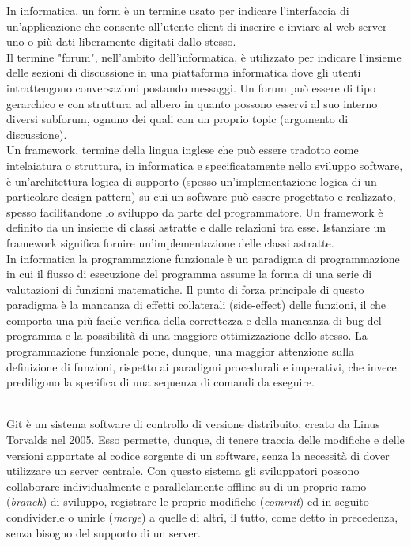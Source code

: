 \documentclass{scalatekids-article}
\begin{document}
 In informatica, un form è un termine usato per indicare l'interfaccia di un'applicazione che consente all'utente client di inserire e inviare al web server uno o più dati liberamente digitati dallo stesso.
\\

 Il termine "forum", nell'ambito dell'informatica, è utilizzato per indicare l'insieme delle sezioni di discussione in una piattaforma informatica dove gli utenti intrattengono conversazioni postando messaggi.
Un forum può essere di tipo gerarchico e con struttura ad albero in quanto possono esservi al suo interno diversi subforum, ognuno dei quali con un proprio topic (argomento di discussione).
\\

 Un framework, termine della lingua inglese che può essere tradotto come intelaiatura o struttura, in informatica e specificatamente nello sviluppo software, è un'architettura logica di supporto (spesso un'implementazione logica di un particolare design pattern) su cui un software può essere progettato e realizzato, spesso facilitandone lo sviluppo da parte del programmatore.
Un framework è definito da un insieme di classi astratte e dalle relazioni tra esse. Istanziare un framework significa fornire un'implementazione delle classi astratte. 
\\

 In informatica la programmazione funzionale è un paradigma di programmazione in cui il flusso di esecuzione del programma assume la forma di una serie di valutazioni di funzioni matematiche. Il punto di forza principale di questo paradigma è la mancanza di effetti collaterali (side-effect) delle funzioni, il che comporta una più facile verifica della correttezza e della mancanza di bug del programma e la possibilità di una maggiore ottimizzazione dello stesso.
  La programmazione funzionale pone, dunque, una maggior attenzione sulla definizione di funzioni, rispetto ai paradigmi procedurali e imperativi, che invece prediligono la specifica di una sequenza di comandi da eseguire.
  \\
\\


 Git è un sistema software di controllo di versione distribuito, creato da Linus Torvalds nel 2005.
Esso permette, dunque, di tenere traccia delle modifiche e delle versioni apportate al codice sorgente di un software, senza la necessità di dover utilizzare un server centrale.
Con questo sistema gli sviluppatori possono collaborare individualmente e parallelamente offline su di un proprio ramo (\textit{branch}) di sviluppo, registrare le proprie modifiche (\textit{commit}) ed in seguito condividerle o unirle (\textit{merge}) a quelle di altri, il tutto, come detto in precedenza, senza bisogno del supporto di un server.
\\
\end{document}

